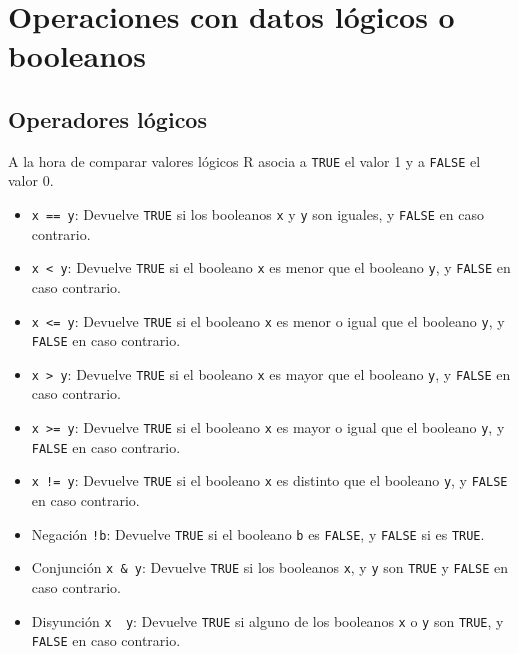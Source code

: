 \documentclass[
  a4paper,
]{scrreport}
\providecommand{\tightlist}{%
  \setlength{\itemsep}{0pt}\setlength{\parskip}{0pt}}\usepackage{longtable,booktabs,array}
\theoremstyle{definition}
\theoremstyle{definition}
\theoremstyle{remark}
\begin{document}
\section{Operaciones con datos lógicos o
booleanos}\label{operaciones-con-datos-luxf3gicos-o-booleanos}

\subsection{Operadores lógicos}\label{operadores-luxf3gicos}

A la hora de comparar valores lógicos R asocia a \texttt{TRUE} el valor
1 y a \texttt{FALSE} el valor 0.

\begin{itemize}
\tightlist
\item
  \texttt{x\ ==\ y}: Devuelve \texttt{TRUE} si los booleanos \texttt{x}
  y \texttt{y} son iguales, y \texttt{FALSE} en caso contrario.
\item
  \texttt{x\ \textless{}\ y}: Devuelve \texttt{TRUE} si el booleano
  \texttt{x} es menor que el booleano \texttt{y}, y \texttt{FALSE} en
  caso contrario.
\item
  \texttt{x\ \textless{}=\ y}: Devuelve \texttt{TRUE} si el booleano
  \texttt{x} es menor o igual que el booleano \texttt{y}, y
  \texttt{FALSE} en caso contrario.
\item
  \texttt{x\ \textgreater{}\ y}: Devuelve \texttt{TRUE} si el booleano
  \texttt{x} es mayor que el booleano \texttt{y}, y \texttt{FALSE} en
  caso contrario.
\item
  \texttt{x\ \textgreater{}=\ y}: Devuelve \texttt{TRUE} si el booleano
  \texttt{x} es mayor o igual que el booleano \texttt{y}, y
  \texttt{FALSE} en caso contrario.
\item
  \texttt{x\ !=\ y}: Devuelve \texttt{TRUE} si el booleano \texttt{x} es
  distinto que el booleano \texttt{y}, y \texttt{FALSE} en caso
  contrario.
\item
  Negación \texttt{!b}: Devuelve \texttt{TRUE} si el booleano \texttt{b}
  es \texttt{FALSE}, y \texttt{FALSE} si es \texttt{TRUE}.
\item
  Conjunción \texttt{x\ \&\ y}: Devuelve \texttt{TRUE} si los booleanos
  \texttt{x}, y \texttt{y} son \texttt{TRUE} y \texttt{FALSE} en caso
  contrario.
\item
  Disyunción \texttt{x\ \textbar{}\ y}: Devuelve \texttt{TRUE} si alguno
  de los booleanos \texttt{x} o \texttt{y} son \texttt{TRUE}, y
  \texttt{FALSE} en caso contrario.
\end{itemize}
\end{document}
